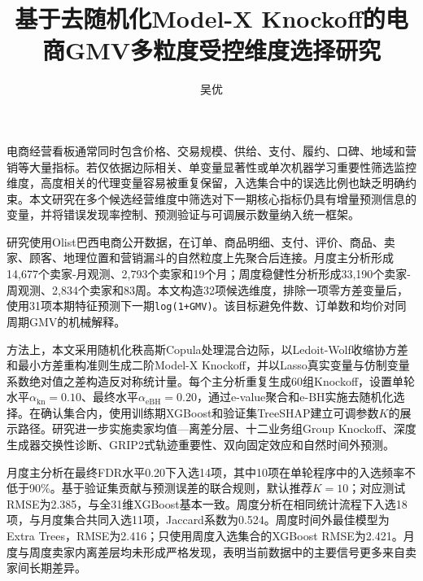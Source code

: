 \documentclass{sufethesismas}
\begin{document}
\classification{}
\confidential{}
\UDC{}
\serialnumber{}
\title{基于去随机化Model-X Knockoff的电商GMV多粒度受控维度选择研究}
\author{吴优}

\maketitle

\frontmatter
\begin{abstractCN}
电商经营看板通常同时包含价格、交易规模、供给、支付、履约、口碑、地域和营销等大量指标。若仅依据边际相关、单变量显著性或单次机器学习重要性筛选监控维度，高度相关的代理变量容易被重复保留，入选集合中的误选比例也缺乏明确约束。本文研究在多个候选经营维度中筛选对下一期核心指标仍具有增量预测信息的变量，并将错误发现率控制、预测验证与可调展示数量纳入统一框架。

研究使用Olist巴西电商公开数据，在订单、商品明细、支付、评价、商品、卖家、顾客、地理位置和营销漏斗的自然粒度上先聚合后连接。月度主分析形成14,677个卖家-月观测、2,793个卖家和19个月；周度稳健性分析形成33,190个卖家-周观测、2,834个卖家和83周。本文构造32项候选维度，排除一项零方差变量后，使用31项本期特征预测下一期\texttt{log(1+GMV)}。该目标避免件数、订单数和均价对同周期GMV的机械解释。

方法上，本文采用随机化秩高斯Copula处理混合边际，以Ledoit-Wolf收缩协方差和最小方差重构准则生成二阶Model-X Knockoff，并以Lasso真实变量与仿制变量系数绝对值之差构造反对称统计量。每个主分析重复生成60组Knockoff，设置单轮水平\(\alpha_{\mathrm{kn}}=0.10\)、最终水平\(\alpha_{\mathrm{eBH}}=0.20\)，通过e-value聚合和e-BH实施去随机化选择。在确认集合内，使用训练期XGBoost和验证集TreeSHAP建立可调参数\(K\)的展示路径。研究进一步实施卖家均值---离差分层、十二业务组Group Knockoff、深度生成器交换性诊断、GRIP2式轨迹重要性、双向固定效应和自然时间外预测。

月度主分析在最终FDR水平0.20下入选14项，其中10项在单轮程序中的入选频率不低于90\%。基于验证集贡献与预测误差的联合规则，默认推荐\(K=10\)；对应测试RMSE为2.385，与全31维XGBoost基本一致。周度分析在相同统计流程下入选18项，与月度集合共同入选11项，Jaccard系数为0.524。周度时间外最佳模型为Extra Trees，RMSE为2.416；只使用周度入选集合的XGBoost RMSE为2.421。月度与周度卖家内离差层均未形成严格发现，表明当前数据中的主要信号更多来自卖家间长期差异。


\end{abstractCN}
\end{document}
